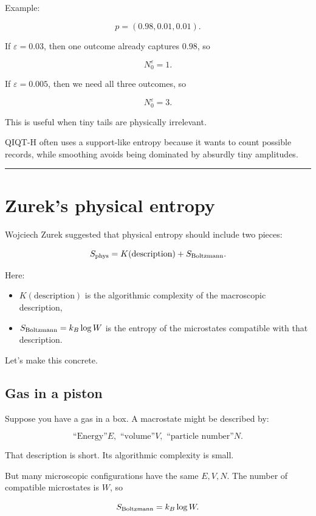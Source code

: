 \documentclass[11pt,a4paper]{article}
\begin{document}
Example:

\[
p=(0.98,0.01,0.01).
\]

If $\varepsilon=0.03$, then one outcome already captures $0.98$, so

\[
N_0^\varepsilon=1.
\]

If $\varepsilon=0.005$, then we need all three outcomes, so

\[
N_0^\varepsilon=3.
\]

This is useful when tiny tails are physically irrelevant.

QIQT-H often uses a support-like entropy because it wants to count possible records, while smoothing avoids being dominated by absurdly tiny amplitudes.

\medskip\hrule\medskip

\section{Zurek’s physical entropy}

Wojciech Zurek suggested that physical entropy should include two pieces:

\[
S_{\rm phys} = K(\text{description}) + S_{\rm Boltzmann}.
\]

Here:

\begin{itemize}
  \item $K(\text{description})$ is the algorithmic complexity of the macroscopic description,
  \item $S_{\rm Boltzmann}=k_B\log W$ is the entropy of the microstates compatible with that description.
\end{itemize}

Let’s make this concrete.

\subsection{Gas in a piston}

Suppose you have a gas in a box. A macrostate might be described by:

\[
\text{``Energy''} E, \text{ ``volume''} V, \text{ ``particle number''} N.
\]

That description is short. Its algorithmic complexity is small.

But many microscopic configurations have the same $E,V,N$. The number of compatible microstates is $W$, so

\[
S_{\rm Boltzmann}=k_B\log W.
\]
\end{document}
